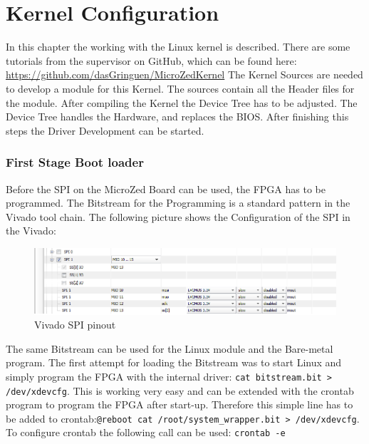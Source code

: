 \chapter{Kernel Configuration}

In this chapter the working with the Linux kernel is described. There are some tutorials from the supervisor on GitHub, which can be found here: \url{https://github.com/dasGringuen/MicroZedKernel}\newline
The Kernel Sources are needed to develop a module for this Kernel. The sources contain all the Header files for the module. After compiling the Kernel the Device Tree has to be adjusted. The Device Tree handles the Hardware, and replaces the BIOS. After finishing this steps the Driver Development can be started.

\subsection{First Stage Boot loader}

Before the SPI on the MicroZed Board can be used, the FPGA has to be programmed. The Bitstream for the Programming is a standard pattern in the Vivado tool chain. The following picture shows the Configuration of the SPI in the Vivado:

\begin{figure}[H]
	\centering
		\includegraphics[width=1.00\textwidth]{picture/Pin_setup.png}
	\caption{Vivado SPI pinout}
	\label{fig:rfm12}
\end{figure}

The same Bitstream can be used for the Linux module and the Bare-metal program. The first attempt for loading the Bitstream was to start Linux and simply program the FPGA with the internal driver: \verb|cat bitstream.bit > /dev/xdevcfg|. This is working very easy and can be extended with the crontab program to program the FPGA after start-up. Therefore this simple line has to be added to crontab:\verb|@reboot cat /root/system_wrapper.bit > /dev/xdevcfg|. To configure crontab the following call can be used: \verb|crontab -e|\newline

